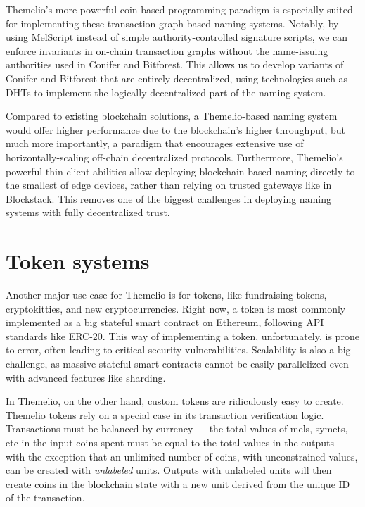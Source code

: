 \documentclass[headinclude,12pt]{scrbook}
\begin{document}
Themelio's more powerful coin-based programming paradigm is especially suited for implementing these transaction graph-based naming systems. Notably, by using MelScript instead of simple authority-controlled signature scripts, we can enforce invariants in on-chain transaction graphs without the name-issuing authorities used in Conifer and Bitforest. This allows us to develop variants of Conifer and Bitforest that are entirely decentralized, using technologies such as DHTs to implement the logically decentralized part of the naming system.

Compared to existing blockchain solutions, a Themelio-based naming system would offer higher performance due to the blockchain's higher throughput, but much more importantly, a paradigm that encourages extensive use of horizontally-scaling off-chain decentralized protocols. Furthermore, Themelio's powerful thin-client abilities allow deploying blockchain-based naming directly to the smallest of edge devices, rather than relying on trusted gateways like in Blockstack. This removes one of the biggest challenges in deploying naming systems with fully decentralized trust.

\section{Token systems}

Another major use case for Themelio is for tokens, like fundraising tokens, cryptokitties, and new cryptocurrencies. Right now, a token is most commonly implemented as a big stateful smart contract on Ethereum, following API standards like ERC-20. This way of implementing a token, unfortunately, is prone to error, often leading to critical security vulnerabilities. Scalability is also a big challenge, as massive stateful smart contracts cannot be easily parallelized even with advanced features like sharding.

In Themelio, on the other hand, custom tokens are ridiculously easy to create. Themelio tokens rely on a special case in its transaction verification logic. Transactions must be balanced by currency --- the total values of mels, symets, etc in the input coins spent must be equal to the total values in the outputs --- with the exception that an unlimited number of coins, with unconstrained values, can be created with \textit{unlabeled} units. Outputs with unlabeled units will then create coins in the blockchain state with a new unit derived from the unique ID of the transaction.
\end{document}
